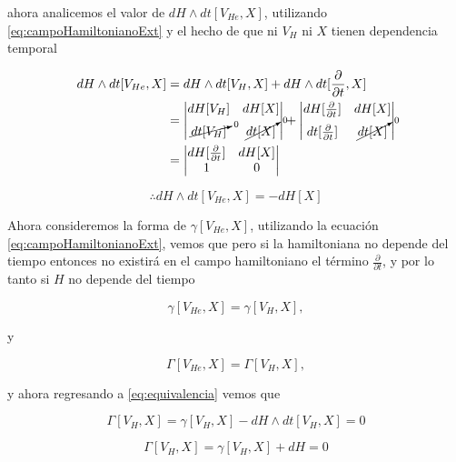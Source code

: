 \documentclass[a4paper,10pt]{article}
\numberwithin{equation}{section}
\begin{document}
ahora analicemos el valor de $dH \wedge dt[V_{He},X]$, utilizando \eqref{eq:campoHamiltonianoExt}
y el hecho de que ni $V_H$ ni $X$ tienen dependencia temporal

\begin{align*}
  dH \wedge dt[V_{He},X] &= dH \wedge dt[V_H,X] + dH \wedge dt[\frac{\partial}{\partial t},X] \\
  &= \left|\begin{matrix}
       dH[V_H] & dH[X] \\
       \cancelto{0}{dt[V_H]} & \cancelto{0}{dt[X]}
      \end{matrix}
      \right| + 
      \left|\begin{matrix}
       dH[\frac{\partial}{\partial t}] & dH[X] \\
       dt[\frac{\partial}{\partial t}] & \cancelto{0}{dt[X]}
      \end{matrix}
      \right| \\
  &= \left|\begin{matrix}
       dH[\frac{\partial}{\partial t}] & dH[X] \\
       1 & 0
      \end{matrix}
      \right|
\end{align*}

\begin{equation}
 \therefore dH \wedge dt[V_{He},X] = - dH[X]
\end{equation}

Ahora consideremos la forma de $\gamma[V_{He},X]$, utilizando la ecuación \eqref{eq:campoHamiltonianoExt}, 
vemos que pero si la hamiltoniana no depende del tiempo entonces no existirá en el campo hamiltoniano el 
término $\frac{\partial}{\partial t}$, y por lo tanto si $H$ no depende 
del tiempo

\begin{equation}
 \gamma[V_{He},X] = \gamma[V_H,X],
\end{equation}

y

\begin{equation}
 \Gamma[V_{He},X] = \Gamma[V_H,X],
\end{equation}

y ahora regresando a \eqref{eq:equivalencia} vemos que 

\begin{equation}
 \Gamma[V_H,X] = \gamma[V_H,X] - dH \wedge dt[V_H,X] = 0
\end{equation}

\begin{equation}
 \Gamma[V_H,X] = \gamma[V_H,X] + dH = 0
\end{equation}
\end{document}
